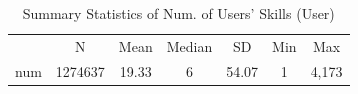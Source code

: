 \begin{table}[htbp]\centering
\def\sym#1{\ifmmode^{#1}\else\(^{#1}\)\fi}
\caption{Summary Statistics of Num. of Users' Skills  (User)}
\begin{tabular}{l*{1}{cccccc}}
\toprule
                    &           N&        Mean&      Median&          SD&         Min&         Max\\
\label{tab:userskillnum}
num                 &     1274637&       19.33&           6&       54.07&           1&       4,173\\
\bottomrule
\end{tabular}
\end{table}
